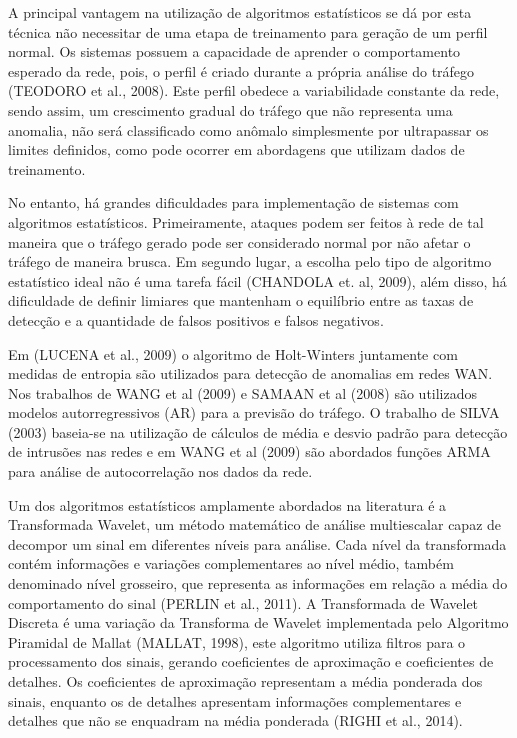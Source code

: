\documentclass[12pt,openright,oneside,a4paper,english,spanish,brazil]{unifil}
\begin{document}
\indent A principal vantagem na utilização de algoritmos estatísticos se dá por esta técnica não necessitar de uma etapa de treinamento para geração de um perfil normal. Os sistemas possuem a capacidade de aprender o comportamento esperado da rede, pois, o perfil é criado durante a própria análise do tráfego (TEODORO et al., 2008). Este perfil obedece a variabilidade constante da rede, sendo assim, um crescimento gradual do tráfego que não representa uma anomalia, não será classificado como anômalo simplesmente por ultrapassar os limites definidos, como pode ocorrer em abordagens que utilizam dados de treinamento. 

\indent No entanto, há grandes dificuldades para implementação de sistemas com algoritmos estatísticos. Primeiramente, ataques podem ser feitos à rede de tal maneira que o tráfego gerado pode ser considerado normal por não afetar o tráfego de maneira brusca. Em segundo lugar, a escolha pelo tipo de algoritmo estatístico ideal não é uma tarefa fácil (CHANDOLA et. al, 2009), além disso, há dificuldade de definir limiares que mantenham o equilíbrio entre as taxas de detecção e a quantidade de falsos positivos e falsos negativos.

\indent Em (LUCENA et al., 2009) o algoritmo de Holt-Winters juntamente com medidas de entropia são utilizados para detecção de anomalias em redes WAN. Nos trabalhos de WANG et al (2009) e SAMAAN et al (2008) são utilizados modelos autorregressivos (AR) para a previsão do tráfego. O trabalho de SILVA (2003) baseia-se na utilização de cálculos de média e desvio padrão para detecção de intrusões nas redes e em WANG et al (2009) são abordados funções ARMA para análise de autocorrelação nos dados da rede. 

\indent Um dos algoritmos estatísticos amplamente abordados na literatura é a Transformada Wavelet, um método matemático de análise multiescalar capaz de decompor um sinal em diferentes níveis para análise. Cada nível da transformada contém informações e variações complementares ao nível médio, também denominado nível grosseiro, que representa as informações em relação a média do comportamento do sinal (PERLIN et al., 2011). A Transformada de Wavelet Discreta é uma variação da Transforma de Wavelet implementada pelo Algoritmo Piramidal de Mallat (MALLAT, 1998), este algoritmo utiliza filtros para o processamento dos sinais, gerando coeficientes de aproximação e coeficientes de detalhes. Os coeficientes de aproximação representam a média ponderada dos sinais, enquanto os de detalhes apresentam informações complementares e detalhes que não se enquadram na média ponderada (RIGHI et al., 2014).
\end{document}
